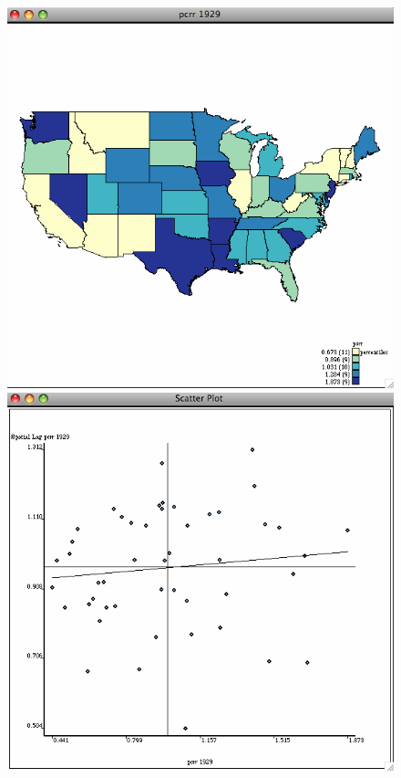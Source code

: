 \documentclass[nototal]{beamer}
\begin{document}
\begin{frame}
\begin{figure}[ht]
\begin{minipage}[b]{0.4\linewidth}
  \end{minipage}
 \begin{minipage}[b]{0.4\linewidth}
  \centering
  \includegraphics[scale=0.20]{income29random.png}
  \end{minipage}
 \begin{minipage}[b]{0.4\linewidth}
  \centering
  \includegraphics[scale=0.20]{moran29random.png}
  \end{minipage}
  \end{figure}
 \end{frame} 
\end{document}
